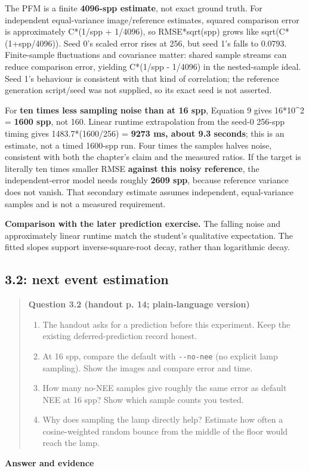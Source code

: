 \documentclass[11pt,a4paper]{article}
\begin{document}
The PFM is a finite \textbf{4096-spp estimate}, not exact ground truth. For independent equal-variance image/\allowbreak{}reference estimates, squared comparison error is approximately C*(1/\allowbreak{}spp + 1/\allowbreak{}4096), so RMSE*sqrt(spp) grows like sqrt(C*(1+spp/\allowbreak{}4096)). Seed 0's scaled error rises at 256, but seed 1's falls to 0.0793. Finite-sample fluctuations and covariance matter: shared sample streams can reduce comparison error, yielding C*(1/\allowbreak{}spp - 1/\allowbreak{}4096) in the nested-sample ideal. Seed 1's behaviour is consistent with that kind of correlation; the reference generation script/\allowbreak{}seed was not supplied, so its exact seed is not asserted.


For \textbf{ten times less sampling noise than at 16 spp}, Equation 9 gives 16*10\textasciicircum{}2 = \textbf{1600 spp}, not 160. Linear runtime extrapolation from the seed-0 256-spp timing gives 1483.7*(1600/\allowbreak{}256) = \textbf{9273 ms, about 9.3 seconds}; this is an estimate, not a timed 1600-spp run. Four times the samples halves noise, consistent with both the chapter's claim and the measured ratios. If the target is literally ten times smaller RMSE \textbf{against this noisy reference}, the independent-error model needs roughly \textbf{2609 spp}, because reference variance does not vanish. That secondary estimate assumes independent, equal-variance samples and is not a measured requirement.


\textbf{Comparison with the later prediction exercise.} The falling noise and approximately linear runtime match the student's qualitative expectation. The fitted slopes support inverse-square-root decay, rather than logarithmic decay.


\subsection*{3.2: next event estimation}
\begin{quote}\small
\textbf{Question 3.2 (handout p. 14; plain-language version)}


\begin{enumerate}
\item The handout asks for a prediction before this experiment. Keep the existing deferred-prediction record honest.
\item At 16 spp, compare the default with \texttt{-{}-no-nee} (no explicit lamp sampling). Show the images and compare error and time.
\item How many no-NEE samples give roughly the same error as default NEE at 16 spp? Show which sample counts you tested.
\item Why does sampling the lamp directly help? Estimate how often a cosine-weighted random bounce from the middle of the floor would reach the lamp.
\end{enumerate}\end{quote}
\textbf{Answer and evidence}
\end{document}
